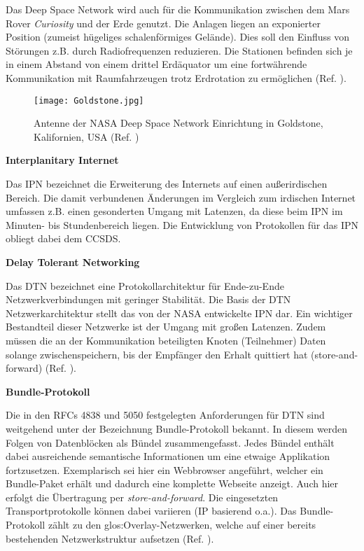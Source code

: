 Das Deep Space Network wird auch f{\"u}r die Kommunikation zwischen dem Mars
Rover \textit{Curiosity} und der Erde genutzt. Die Anlagen liegen an exponierter Position
(zumeist h{\"u}geliges schalenf{\"o}rmiges Gel{\"a}nde). Dies soll den
Einfluss von St{\"o}rungen z.B. durch Radiofrequenzen reduzieren. Die Stationen
befinden sich je in einem Abstand von einem drittel Erd{\"a}quator um eine
fortw{\"a}hrende Kommunikation mit Raumfahrzeugen trotz Erdrotation zu
erm{\"o}glichen (Ref. \cite{web6}).

\begin{figure}[H]
\centering
\texttt{[image: Goldstone.jpg]}
\caption{Antenne der NASA Deep Space Network Einrichtung in Goldstone,
Kalifornien, USA (Ref. \cite{imgGoldstone})}
\label{fig:Goldstone}
\end{figure}

\textbf{Interplanitary Internet}

Das \gls{IPN} bezeichnet die Erweiterung des Internets
auf einen au{\ss}erirdischen Bereich. Die damit verbundenen {\"A}nderungen im
Vergleich zum irdischen Internet umfassen z.B. einen gesonderten Umgang mit
Latenzen, da diese beim \gls{IPN} im Minuten- bis Stundenbereich liegen. Die
Entwicklung von Protokollen f{\"u}r das \gls{IPN} obliegt dabei dem \gls{CCSDS}.

\textbf{Delay Tolerant Networking}

Das \gls{DTN} bezeichnet eine Protokollarchitektur f{\"u}r
Ende-zu-Ende Netzwerkverbindungen mit geringer Stabilit{\"a}t. Die Basis der
\gls{DTN} Netzwerkarchitektur stellt das von der NASA entwickelte \gls{IPN} dar. Ein wichtiger
Bestandteil dieser Netzwerke ist der Umgang mit gro{\ss}en Latenzen. Zudem
m{\"u}ssen die an der Kommunikation beteiligten Knoten (Teilnehmer)
Daten solange zwischenspeichern, bis der Empf{\"a}nger den Erhalt quittiert hat
(store-and-forward) (Ref. \cite{web3}).

\textbf{Bundle-Protokoll}

Die in den RFCs 4838 und 5050 festgelegten Anforderungen f{\"u}r \gls{DTN} sind
weitgehend unter der Bezeichnung Bundle-Protokoll bekannt. In diesem werden
Folgen von Datenbl{\"o}cken als B{\"u}ndel zusammengefasst. Jedes B{\"u}ndel enth{\"a}lt
dabei ausreichende semantische Informationen um eine etwaige Applikation
fortzusetzen. Exemplarisch sei hier ein Webbrowser angef{\"u}hrt, welcher ein
Bundle-Paket erh{\"a}lt und dadurch eine komplette Webseite anzeigt. Auch hier
erfolgt die {\"U}bertragung per \textit{store-and-forward}. Die eingesetzten
Transportprotokolle k{\"o}nnen dabei variieren (\gls{IP} basierend o.a.). Das
Bundle-Protokoll z{\"a}hlt zu den \gls{glos:Overlay}-Netzwerken, welche
auf einer bereits bestehenden Netzwerkstruktur aufsetzen (Ref. \cite{web1}).

